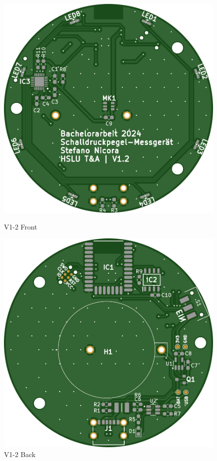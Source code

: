 \documentclass[12pt]{article}
\begin{document}
	\begin{figure}[H]
		\centering
		\begin{minipage}{.5\textwidth}
			\centering
			\includegraphics[width=1\linewidth]{images/BAT_PCB_V1-2_top}
			\caption[]{V1-2 Front}
			\label{fig:pcb_V1-2_front}
		\end{minipage}%
		\begin{minipage}{.5\textwidth}
			\centering
			\includegraphics[width=1\linewidth]{images/BAT_PCB_V1-2_bottom}
			\caption[]{V1-2 Back}
			\label{fig:pcb_V1-2_back}
		\end{minipage}
	\end{figure}
\end{document}
